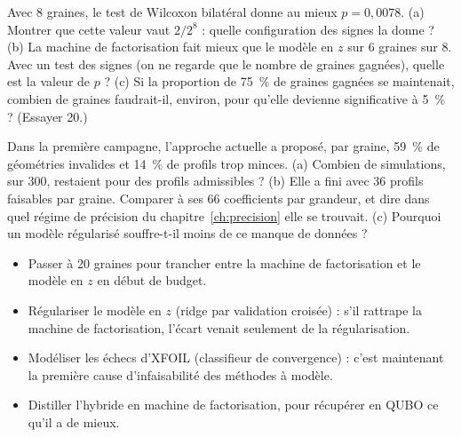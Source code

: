 \exercices
\begin{exercice}\label{ex:ech-wilcoxon}
Avec 8 graines, le test de Wilcoxon bilatéral donne au mieux $p=0{,}0078$. (a) Montrer que cette valeur vaut $2/2^8$ : quelle configuration des signes la donne ? (b) La machine de factorisation fait mieux que le modèle en $z$ sur 6 graines sur 8. Avec un test des signes (on ne regarde que le nombre de graines gagnées), quelle est la valeur de $p$ ? (c) Si la proportion de 75~\% de graines gagnées se maintenait, combien de graines faudrait-il, environ, pour qu'elle devienne significative à 5~\% ? (Essayer 20.)
\end{exercice}
\begin{exercice}\label{ex:ech-budget}
Dans la première campagne, l'approche actuelle a proposé, par graine, 59~\% de géométries invalides et 14~\% de profils trop minces. (a) Combien de simulations, sur 300, restaient pour des profils admissibles ? (b) Elle a fini avec 36 profils faisables par graine. Comparer à ses 66 coefficients par grandeur, et dire dans quel régime de précision du chapitre~\ref{ch:precision} elle se trouvait. (c) Pourquoi un modèle régularisé souffre-t-il moins de ce manque de données ?
\end{exercice}

\begin{pistes}
\begin{itemize}
\item Passer à 20 graines pour trancher entre la machine de factorisation et le modèle en $z$ en début de budget.
\item Régulariser le modèle en $z$ (ridge par validation croisée) : s'il rattrape la machine de factorisation, l'écart venait seulement de la régularisation.
\item Modéliser les échecs d'XFOIL (classifieur de convergence) : c'est maintenant la première cause d'infaisabilité des méthodes à modèle.
\item Distiller l'hybride en machine de factorisation, pour récupérer en QUBO ce qu'il a de mieux.
\end{itemize}
\end{pistes}
